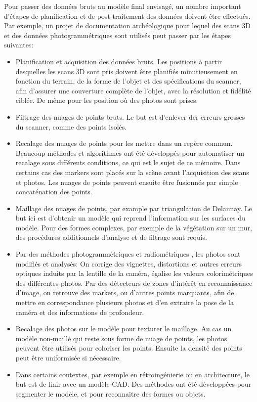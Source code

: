 \documentclass[a4paper,10pt]{scrreprt}
\begin{document}
Pour passer des données bruts au modèle final envisagé, un nombre important d'étapes de planification et de post-traitement des données doivent être effectués. Par exemple, un projet de documentation archéologique pour lequel des scans 3D et des données photogrammétriques sont utilisés peut passer par les étapes suivantes: \cite{Lerm2009}
\begin{itemize}
	\item Planification et acquisition des données bruts. Les positions à partir desquelles les scans 3D sont pris doivent être planifiés minutieusement en fonction du terrain, de la forme de l'objet et des spécifications du scanner, afin d'assurer une couverture complète de l'objet, avec la résolution et fidélité ciblée. De même pour les position où des photos sont prises.
	\item Filtrage des nuages de points bruts. Le but est d'enlever der erreurs grosses du scanner, comme des points isolés.
	\item Recalage des nuages de points pour les mettre dans un repère commun. Beaucoup méthodes et algorithmes ont été développés pour automatiser un recalage sous différents conditions, ce qui est le sujet de ce mémoire. Dans certains cas des markers sont placés sur la scène avant l'acquisition des scans et photos. Les nuages de points peuvent ensuite être fusionnés par simple concaténation des points.
	\item Maillage des nuages de points, par example par triangulation de Delaunay. Le but ici est d'obtenir un modèle qui reprend l'information sur les surfaces du modèle. Pour des formes complexes, par exemple de la végétation sur un mur, des procédures additionnels d'analyse et de filtrage sont requis.
	\item Par des méthodes photogrammétriques \cite{Tour009} et radiométriques \cite{Giro2013}, les photos sont modifiés et analysés: On corrige des vignettes, distortions et autres erreurs optiques induits par la lentille de la caméra, égalise les valeurs colorimétriques des différentes photos. Par des détecteurs de zones d'intérêt en reconnaissance d'image, on retrouve des markers, ou d'autres points marquants, afin de mettre en correspondance plusieurs photos et d'en extraire la pose de la caméra et des informations de profondeur.
	\item Recalage des photos sur le modèle pour texturer le maillage. Au cas un modèle non-maillé qui reste sous forme de nuage de points, les photos peuvent être utilisés pour coloriser les points. Ensuite la densité des points peut être uniformisée si nécessaire.
	\item Dans certains contextes, par exemple en rétroingénierie ou en architecture, le but est de finir avec un modèle CAD. Des méthodes ont été développées pour segmenter le modèle, et pour reconnaitre des formes ou objets.
\end{itemize}
\end{document}
